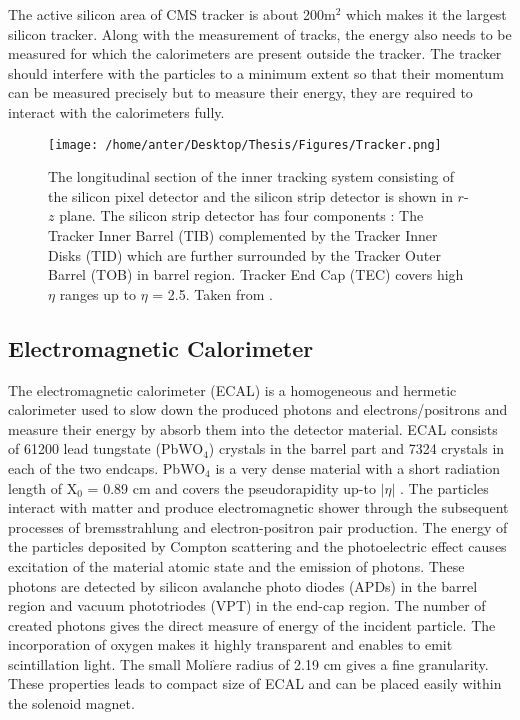 The active silicon area of CMS tracker is about 200m$^{2}$ which makes it the largest silicon tracker. Along with the measurement of tracks, the energy also needs to be measured for which the calorimeters are present outside the tracker. The tracker should interfere with the particles to a minimum extent so that their momentum can be measured precisely but to measure their energy, they are required to interact with the calorimeters fully.

\begin{figure}[!h]
\begin{center} 
\vspace*{2mm}
\hspace*{-10mm}
\texttt{[image: /home/anter/Desktop/Thesis/Figures/Tracker.png]}\\
\caption{The longitudinal section of the inner tracking system consisting of the silicon pixel detector and the silicon strip detector is shown in $r$-$z$ plane. The silicon strip detector has four components : The Tracker Inner Barrel (TIB) complemented by the Tracker Inner Disks (TID) which are further surrounded by the Tracker Outer Barrel (TOB) in barrel region. Tracker End Cap (TEC) covers high $\eta$ ranges up to $\eta$ = 2.5. Taken from \cite{Chatrchyan:2008aa}.}
\label{fig:tracker}
\end{center}
\end{figure}

\subsection{Electromagnetic Calorimeter}
The electromagnetic calorimeter (ECAL) is a homogeneous and hermetic calorimeter used to slow down the produced photons and electrons/positrons and measure their energy by absorb them into the detector material. ECAL consists of 61200 lead tungstate (PbWO$_4$) crystals in the barrel part and 7324 crystals in each of the two endcaps. PbWO$_4$ is a very dense material with a short radiation length of X$_0$ = 0.89 cm and covers the pseudorapidity up-to $|\eta|$ . The particles interact with matter and produce electromagnetic shower through the subsequent processes of bremsstrahlung and electron-positron pair production. The energy of the particles deposited by Compton scattering and the photoelectric effect causes excitation of the material atomic state and the emission of photons. These photons are detected by silicon avalanche photo diodes (APDs) in the barrel region and vacuum phototriodes (VPT) in the end-cap region. The number of created photons gives the direct measure of energy of the incident particle. The incorporation of oxygen makes it highly transparent and enables to emit scintillation light. The small Moli$\grave{e}$re radius of 2.19 cm gives a fine granularity. These properties leads to compact size of ECAL and can be placed easily within the solenoid magnet. 

